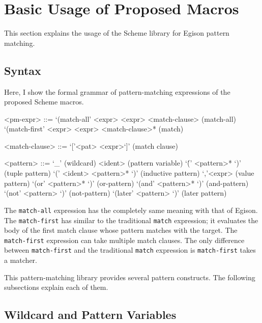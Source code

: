 \documentclass[acmlarge]{acmart}
\begin{document}
\section{Basic Usage of Proposed Macros}\label{usage}

This section explains the usage of the Scheme library for Egison pattern matching.

\subsection{Syntax}\label{suyntax}

Here, I show the formal grammar of pattern-matching expressions of the proposed Scheme macros.

\begin{grammar}
<pm-expr> ::= `(match-all' <expr> <expr> <match-clause>         \hfill (match-all)
  \alt `(match-first' <expr> <expr> <match-clause>*      \hfill (match)

<match-clause> ::= `['<pat> <expr>`]' \hfill (match clause)

<pattern> ::= `\_'                    \hfill (wildcard)
  \alt <ident>                        \hfill (pattern variable)
  \alt `\'(' <pattern>* `)'      \hfill (tuple pattern)
  \alt `(' <ident> <pattern>* `)'     \hfill (inductive pattern)
  \alt `,'<expr>                      \hfill (value pattern)
  \alt `(or' <pattern>* `)'      \hfill (or-pattern)
  \alt `(and' <pattern>* `)'     \hfill (and-pattern)
  \alt `(not' <pattern> `)'      \hfill (not-pattern)
  \alt `(later' <pattern> `)'    \hfill (later pattern)
\end{grammar}

The \texttt{match-all} expression has the completely same meaning with that of Egison.
The \texttt{match-first} has similar to the traditional \texttt{match} expression; it evaluates the body of the first match clause whose pattern matches with the target.
The \texttt{match-first} expression can take multiple match clauses.
The only difference between \texttt{match-first} and the traditional \texttt{match} expression is \texttt{match-first} takes a matcher.

This pattern-matching library provides several pattern constructs.
The following subsections explain each of them.

\subsection{Wildcard and Pattern Variables}
\end{document}
